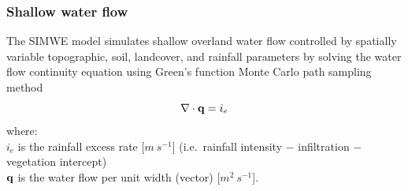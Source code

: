 \documentclass[gmd, manuscript]{copernicus}
\begin{document}

\subsubsection{Shallow water flow}

The SIMWE model simulates shallow overland water flow
controlled by spatially variable topographic, soil, landcover, 
and rainfall parameters by solving the water flow continuity equation 
using Green's function Monte Carlo path sampling method 
\begin{equation}
\label{eq:water}
\nabla \cdot {\bf q} = i_e
\end{equation}
{\small
\noindent
where: \\
\noindent
\hspace*{0.5em} $i_e$ is the rainfall excess rate [$\unit{m~s^{-1}}$]
(i.e.~rainfall intensity $-$ infiltration $-$ vegetation intercept)\\
\hspace*{0.5em} ${\bf q}$ is the water flow per unit width (vector) [$\unit{m}^2~\unit{s}^{-1}$]. 
}
\end{document}

